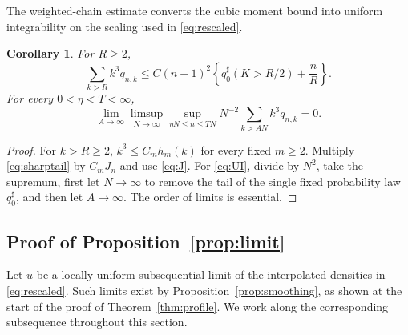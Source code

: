 \documentclass[11pt,letterpaper,reqno]{amsart}
\theoremstyle{plain}
\newtheorem{corollary}[theorem]{Corollary}
\begin{document}
The weighted-chain estimate converts the cubic moment bound into uniform integrability on the scaling used in \eqref{eq:rescaled}.
\begin{corollary}\label{cor:thirdtail}
For $R\ge2$,
\begin{equation}\label{eq:thirdtail}
 \sum_{k>R}k^3q_{n,k}
 \le C(n+1)^2\left\{q_0^\sharp(K>R/2)+\frac nR\right\}.
\end{equation}
For every $0<\eta<T<\infty$,
\begin{equation}\label{eq:UI}
 \lim_{A\to\infty}\limsup_{N\to\infty}
 \sup_{\eta N\le n\le TN}N^{-2}\sum_{k>AN}k^3q_{n,k}=0.
\end{equation}
\end{corollary}
\begin{proof}
For $k>R\ge2$, $k^3\le C_mh_m(k)$ for every fixed $m\ge2$. Multiply \eqref{eq:sharptail} by $C_mJ_n$ and use \eqref{eq:J}. For \eqref{eq:UI}, divide by $N^2$, take the supremum, first let $N\to\infty$ to remove the tail of the single fixed probability law $q_0^\sharp$, and then let $A\to\infty$. The order of limits is essential.
\end{proof}

\subsection{Proof of Proposition~\ref{prop:limit}}
Let $u$ be a locally uniform subsequential limit of the interpolated densities in \eqref{eq:rescaled}. Such limits exist by Proposition~\ref{prop:smoothing}, as shown at the start of the proof of Theorem~\ref{thm:profile}. We work along the corresponding subsequence throughout this section.
\end{document}
